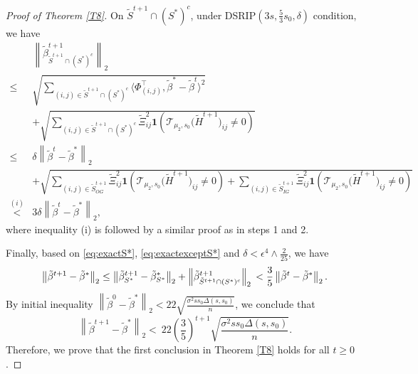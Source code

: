 \documentclass[12pt]{article}
\newtheorem{proof}{Proof}
\begin{document}
\begin{appendix}
\begin{proof}[Proof of Theorem \ref{T8}]
On $\tilde S^{t+1} \cap (S^*)^c$, under DSRIP$(3s,\frac53 s_0, \delta )$ condition, we have 
\begin{equation}\label{eq:exactexceptS*}
\begin{aligned}
& \left\|\tilde \beta_{\tilde S^{t+1} \cap (S^*)^c}^{t+1} \right\|_2\\
\le & \sqrt{\sum_{(i,j) \in \tilde S^{t+1} \cap (S^*)^c} \langle{\Phi}_{(i,j)}^\top, \tilde\beta^* - \tilde\beta^{t} \rangle^2 }\\
& + \sqrt{\sum_{(i,j) \in \tilde S^{t+1} \cap (S^*)^c} \tilde\Xi_{ij}^2 \mathbf1 \left( \mathcal T_{\mu_2,s_0} \big(\tilde H^{t+1}\big)_{ij}\ne 0\right) }\\
\le & \delta \left\| \tilde\beta^t - \tilde \beta^* \right\|_2 \\
& + \sqrt{\sum_{(i,j) \in \tilde S_{OG}^{t+1}} \tilde \Xi_{ij}^2 \mathbf1 \left( \mathcal T_{\mu_2,s_0} \big(\tilde H^{t+1}\big)_{ij}\ne 0\right) 
 +  \sum_{(i,j) \in \tilde S_{IG}^{t+1}} \tilde \Xi_{ij}^2 \mathbf1 \left( \mathcal T_{\mu_2,s_0} \big(\tilde H^{t+1}\big)_{ij}\ne 0\right) }\\
\overset{(i)}{<} & 3 \delta \left\| \tilde\beta^t -\tilde \beta^* \right\|_2,
\end{aligned}
\end{equation}
where inequality (i) is followed by a similar proof as in steps 1 and 2.

Finally, based on \eqref{eq:exactS*}, \eqref{eq:exactexceptS*} and $\delta < \epsilon^4 \wedge \frac2{25} $, we have 
\begin{equation}
    \left\|\tilde \beta^{t+1} - \tilde\beta^* \right\|_2 
    \le  \left\|\tilde \beta_{S^*}^{t+1} - \tilde\beta_{S^*}^* \right\|_2 
         + \left\|\tilde\beta_{\tilde S^{t+1}\cap(S^*)^c}^{t+1}  \right\|_2\\
    <  \frac35 \left\| \tilde\beta^t -\tilde \beta^* \right\|_2. 
\end{equation}
By initial inequality $\left\| \tilde \beta^0 - \tilde \beta^* \right\|_2 < 22 \sqrt{ \frac{ \sigma^2 ss_0 \Delta(s,s_0)}{n} }$, we conclude that
\begin{equation}
   \left\|\tilde \beta^{t+1} - \tilde \beta^* \right\|_2
<~  22 \left( \frac35 \right)^{t+1}\sqrt{ \frac{ \sigma^2 ss_0 \Delta(s,s_0)}{n} }.
\end{equation}
Therefore, we prove that the first conclusion in Theorem \ref{T8} holds for all $ t \ge 0$.


\end{proof}
\end{appendix}
\end{document}
